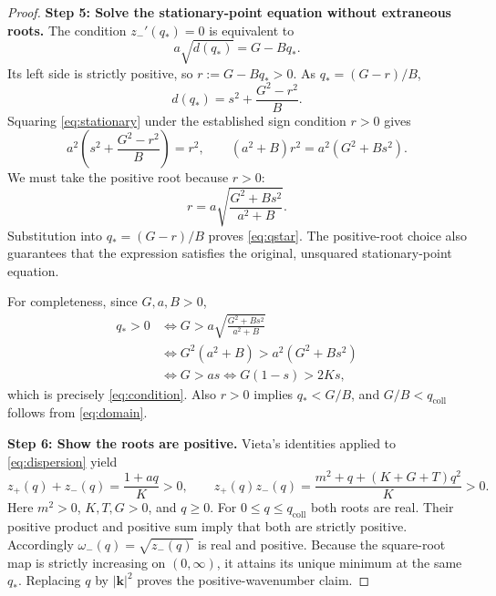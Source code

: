\documentclass[11pt]{article}
\begin{document}
\begin{proof}
\par\medskip\noindent\textbf{Step 5: Solve the stationary-point equation without extraneous roots.}\enspace
The condition $z_-'(q_*)=0$ is equivalent to
\begin{equation}\label{eq:stationary}
 a\sqrt{d(q_*)}=G-Bq_*.
\end{equation}
Its left side is strictly positive, so $r:=G-Bq_*>0$.
As $q_*=(G-r)/B$,
\[
 d(q_*)=s^2+\frac{G^2-r^2}{B}.
\]
Squaring \eqref{eq:stationary} under the established sign condition
$r>0$ gives
\[
 a^2\left(s^2+\frac{G^2-r^2}{B}\right)=r^2,
 \qquad
 (a^2+B)r^2=a^2(G^2+Bs^2).
\]
We must take the positive root because $r>0$:
\[
 r=a\sqrt{\frac{G^2+Bs^2}{a^2+B}}.
\]
Substitution into $q_*=(G-r)/B$ proves \eqref{eq:qstar}.
The positive-root choice also guarantees that the expression satisfies
the original, unsquared stationary-point equation.

For completeness, since $G,a,B>0$,
\begin{align*}
 q_*>0
 &\iff G>a\sqrt{\frac{G^2+Bs^2}{a^2+B}}\\
 &\iff G^2(a^2+B)>a^2(G^2+Bs^2)\\
 &\iff G>as
 \iff G(1-s)>2Ks,
\end{align*}
which is precisely \eqref{eq:condition}.  Also $r>0$ implies
$q_*<G/B$, and $G/B<q_{\mathrm{coll}}$ follows from
\eqref{eq:domain}.

\par\medskip\noindent\textbf{Step 6: Show the roots are positive.}\enspace
Vieta's identities applied to \eqref{eq:dispersion} yield
\begin{equation}\label{eq:vieta}
 z_+(q)+z_-(q)=\frac{1+aq}{K}>0,
 \qquad
 z_+(q)z_-(q)=
 \frac{m^2+q+(K+G+T)q^2}{K}>0.
\end{equation}
Here $m^2>0$, $K,T,G>0$, and $q\geq0$.
For $0\leq q\leq q_{\mathrm{coll}}$ both roots are real.
Their positive product and positive sum imply that both are strictly
positive.  Accordingly $\omega_-(q)=\sqrt{z_-(q)}$ is real and positive.
Because the square-root map is strictly increasing on $(0,\infty)$,
it attains its unique minimum at the same $q_*$.
Replacing $q$ by $|\mathbf{k}|^2$ proves the positive-wavenumber claim.
\end{proof}
\end{document}
